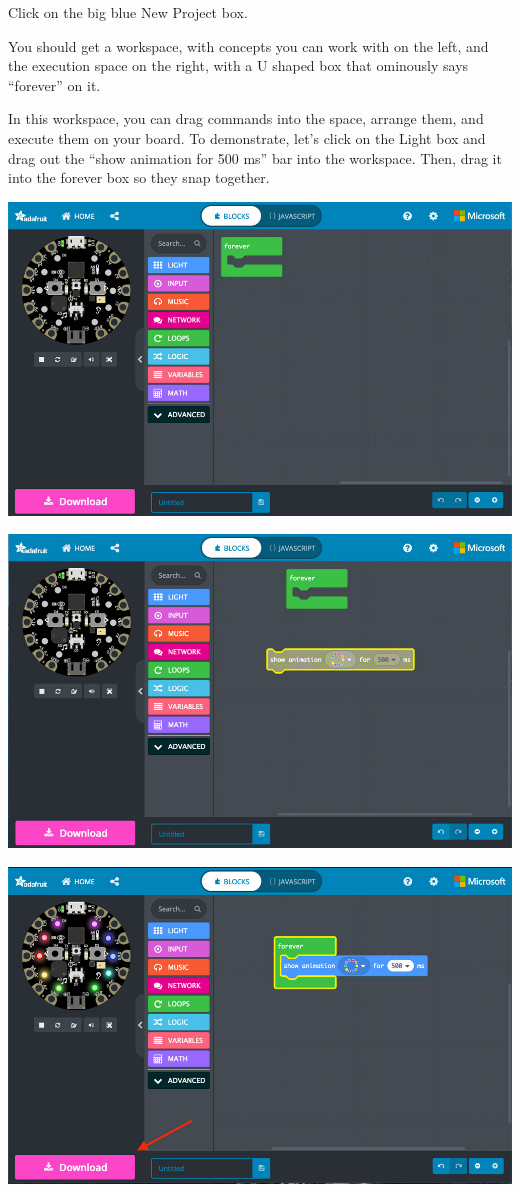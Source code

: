 \documentclass[
]{book}
\begin{document}
Click on the big blue New Project box.

You should get a workspace, with concepts you can work with on the left, and the execution space on the right, with a U shaped box that ominously says ``forever'' on it.

In this workspace, you can drag commands into the space, arrange them, and execute them on your board. To demonstrate, let's click on the Light box and drag out the ``show animation for 500 ms'' bar into the workspace. Then, drag it into the forever box so they snap together.

\includegraphics[width=1\linewidth]{images/01image2}

\includegraphics[width=1\linewidth]{images/01image3}

\includegraphics[width=1\linewidth]{images/01image4}
\end{document}
